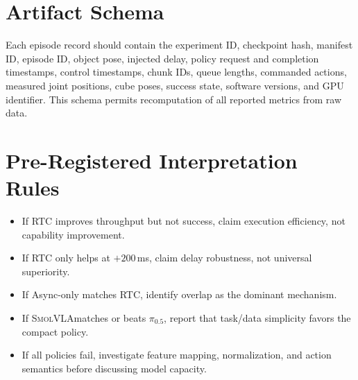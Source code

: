 \documentclass[10pt,twocolumn]{article}
\newcommand{\pifive}{$\pi_{0.5}$}
\newcommand{\smolvla}{\textsc{SmolVLA}}
\begin{document}
\section{Artifact Schema}

Each episode record should contain the experiment ID, checkpoint hash,
manifest ID, episode ID, object pose, injected delay, policy request and
completion timestamps, control timestamps, chunk IDs, queue lengths,
commanded actions, measured joint positions, cube poses, success state,
software versions, and GPU identifier.  This schema permits recomputation of
all reported metrics from raw data.

\section{Pre-Registered Interpretation Rules}

\begin{itemize}
  \item If RTC improves throughput but not success, claim execution efficiency,
        not capability improvement.
  \item If RTC only helps at $+200$\,ms, claim delay robustness, not universal
        superiority.
  \item If Async-only matches RTC, identify overlap as the dominant mechanism.
  \item If \smolvla matches or beats \pifive, report that task/data simplicity
        favors the compact policy.
  \item If all policies fail, investigate feature mapping, normalization, and
        action semantics before discussing model capacity.
\end{itemize}
\end{document}
